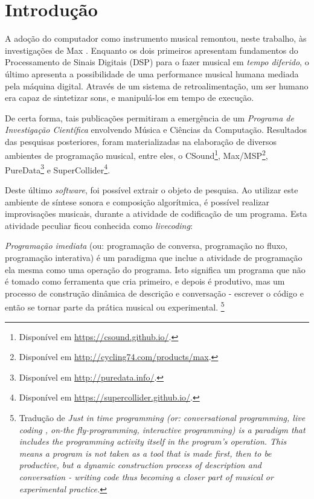 \chapter*[Introdução]{Introdução}

A adoção do computador como instrumento musical remontou, neste trabalho, às investigações de Max . Enquanto os dois primeiros apresentam fundamentos do Processamento de Sinais Digitais (DSP) para o fazer musical em \emph{tempo diferido},  o último apresenta a possibilidade de uma performance musical humana mediada pela máquina digital. Através de um sistema de retroalimentação, um ser humano era capaz de sintetizar sons, e manipulá-los em tempo de execução.

De certa forma, tais publicações permitiram a emergência de um \emph{Programa de Investigação Científica} \cite{lakatos_falsification_1970,neto_lakatos_2008} envolvendo Música e Ciências da Computação. Resultados das pesquisas posteriores, foram materializadas na elaboração de diversos ambientes de programação musical, entre eles, o CSound\footnote{Disponível em \url{https://csound.github.io/}.}, Max/MSP\footnote{Disponível em \url{http://cycling74.com/products/max}.}, PureData\footnote{Disponível em \url{http://puredata.info/}.} e SuperCollider\footnote{Disponível em \url{https://supercollider.github.io/}.}.

Deste último \emph{software}, foi possível extrair o objeto de pesquisa. Ao utilizar este ambiente de síntese sonora e composição algorítmica, é possível realizar improvisações musicais, durante a atividade de codificação de um programa. Esta atividade peculiar ficou conhecida como \emph{livecoding}:

\begin{citacao}
\emph{Programação imediata} (ou: programação de conversa, programação no fluxo, programação interativa) é um paradigma que inclue a atividade de programação ela mesma como uma operação do programa. Isto significa um programa que não é tomado como ferramenta que cria primeiro, e depois é produtivo, mas um processo de construção dinâmica de descrição e conversação - escrever o código e então se tornar parte da prática musical ou experimental. \cite[Verbete JITLib]{supercollider.org_supercollider_2014}\footnote{Tradução de \emph{Just in time programming (or: conversational programming, live coding , on-the fly-programming, interactive programming) is a paradigm that includes the programming activity itself in the program's operation. This means a program is not taken as a tool that is made first, then to be productive, but a dynamic construction process of description and conversation - writing code thus becoming a closer part of musical or experimental practice.}}
\end{citacao}

